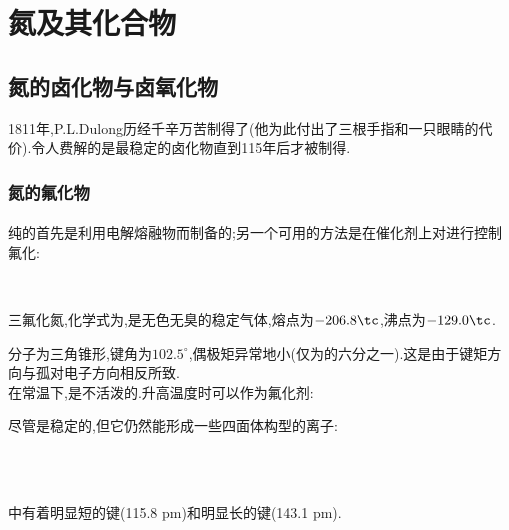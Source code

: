 \documentclass{ctexbook}
\begin{document}
\section{氮及其化合物}
\subsection{氮的卤化物与卤氧化物}
1811年,P.L.Dulong历经千辛万苦制得了(他为此付出了三根手指和一只眼睛的代价).令人费解的是最稳定的卤化物直到115年后才被制得.
\subsubsection{氮的氟化物}
\paragraph{}
纯的首先是利用电解熔融物而制备的;另一个可用的方法是在催化剂上对进行控制氟化:
\begin{center}
    \\
\end{center}
\begin{substance}[\ce{NF3}]
    三氟化氮,化学式为,是无色无臭的稳定气体,熔点为$-206.8\tc$,沸点为$-129.0\tc$.
\end{substance}
\indent{}分子为三角锥形,键角为$102.5^\circ$,偶极矩异常地小(仅为的六分之一).这是由于键矩方向与孤对电子方向相反所致.\\
\indent 在常温下,是不活泼的.升高温度时可以作为氟化剂:
\begin{center}
\end{center}
尽管是稳定的,但它仍然能形成一些四面体构型的离子:
\begin{center}
    \\
    \\
\end{center}
中有着明显短的键(115.8 pm)和明显长的键(143.1 pm).
\end{document}
